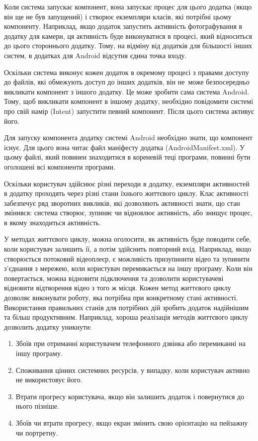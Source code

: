 \documentclass[../main.tex]{subfiles}
\begin{document}
Коли система запускає компонент, вона запускає процес для цього додатка (якщо він ще не був запущений) і створює екземпляри класів, які потрібні цьому компоненту. Наприклад, якщо додаток запустить активність фотографування в додатку для камери, ця активність буде виконуватися в процесі, який відноситься до цього стороннього додатку. Тому, на відміну від додатків для більшості інших систем, в додатках для Android відсутня єдина точка входу.

Оскільки система виконує кожен додаток в окремому процесі з правами доступу до файлів, які обмежують доступ до інших додатків, він не~може безпосередньо викликати компонент з іншого додатку. Це може зробити сама система Android. Тому, щоб викликати компонент в іншому додатку, необхідно повідомити системі про свій намір (Intent) запустити певний компонент. Після цього система активує його.

Для запуску компонента додатку системі Android необхідно знати, що компонент існує. Для цього вона читає файл маніфесту додатка (AndroidManifest.xml). У цьому файлі, який повинен знаходитися в кореневій теці програми, повинні бути оголошені всі компоненти програми.

Оскільки користувач здійснює різні переходи в додатку, екземпляри активностей в додатку проходять через різні стани їхнього життєвого циклу. Клас активності забезпечує ряд зворотних викликів, які дозволяють активності знати, що стан змінився: система створює, зупиняє чи відновлює активність, або знищує процес, в якому знаходиться активність.

У методах життєвого циклу, можна оголосити, як активність буде поводити себе, коли користувач залишить її, а потім здійснить повторний вхід. Наприклад, якщо створюється потоковий відеоплеєр, є можливість призупинити відео та зупинити з'єднання з мережею, коли користувач перемикається на іншу програму. Коли він повертається, можна відновити підключення та дозволити користувачеві відновити відтворення відео з того ж місця. Кожен метод життєвого циклу дозволяє виконувати роботу, яка потрібна при конкретному стані активності. Використання правильних станів для потрібних дій зробить додаток надійнішим та більш продуктивним. Наприклад, хороша реалізація методів життєвого циклу дозволить додатку уникнути:

\begin{enumerate}
	\item Збоїв при отриманні користувачем телефонного дзвінка або перемиканні на іншу програму.
	\item Споживання цінних системних ресурсів, у випадку, коли користувач активно не використовує його.
	\item Втрати прогресу користувача, якщо він залишить додаток і повернутися до нього пізніше.
	\item Збоїв чи втрати прогресу, якщо екран змінить свою орієнтацію на пейзажну чи портретну.
\end{enumerate}
\end{document}

